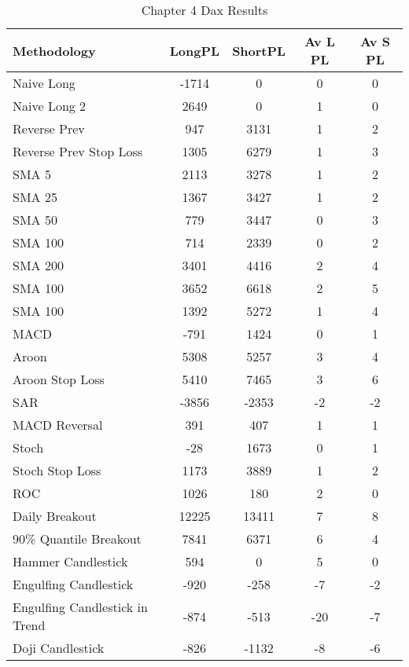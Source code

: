 \begin{table}[ht]
\centering
\caption[Chapter 4 Dax Results]{Chapter 4 Dax Results} 
\label{tab:chp6:dax_summary}
\begin{tabular}{lcccc}
  \toprule Methodology & LongPL & ShortPL & Av L PL & Av S PL \\ 
  \midrule Naive Long & -1714 & 0 & 0 & 0 \\ 
  Naive Long 2 & 2649 & 0 & 1 & 0 \\ 
  Reverse Prev & 947 & 3131 & 1 & 2 \\ 
  Reverse Prev Stop Loss & 1305 & 6279 & 1 & 3 \\ 
  SMA 5 & 2113 & 3278 & 1 & 2 \\ 
  SMA 25 & 1367 & 3427 & 1 & 2 \\ 
  SMA 50 & 779 & 3447 & 0 & 3 \\ 
  SMA 100 & 714 & 2339 & 0 & 2 \\ 
  SMA 200 & 3401 & 4416 & 2 & 4 \\ 
  SMA 100 & 3652 & 6618 & 2 & 5 \\ 
  SMA 100 & 1392 & 5272 & 1 & 4 \\ 
  MACD & -791 & 1424 & 0 & 1 \\ 
  Aroon & 5308 & 5257 & 3 & 4 \\ 
  Aroon Stop Loss & 5410 & 7465 & 3 & 6 \\ 
  SAR & -3856 & -2353 & -2 & -2 \\ 
  MACD Reversal & 391 & 407 & 1 & 1 \\ 
  Stoch & -28 & 1673 & 0 & 1 \\ 
  Stoch Stop Loss & 1173 & 3889 & 1 & 2 \\ 
  ROC & 1026 & 180 & 2 & 0 \\ 
  Daily Breakout & 12225 & 13411 & 7 & 8 \\ 
  90\% Quantile Breakout & 7841 & 6371 & 6 & 4 \\ 
  Hammer Candlestick & 594 & 0 & 5 & 0 \\ 
  Engulfing Candlestick & -920 & -258 & -7 & -2 \\ 
  Engulfing Candlestick in Trend & -874 & -513 & -20 & -7 \\ 
  Doji Candlestick & -826 & -1132 & -8 & -6 \\ 
   \bottomrule \end{tabular}
\end{table}
